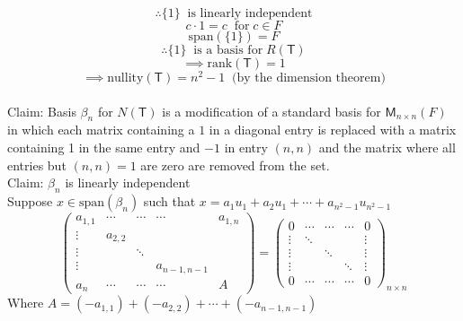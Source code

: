 \begin{enumerate}[(a)]
\begin{equation}
\therefore \{1\}\;\; \text{is linearly independent}
\end{equation}
\begin{equation}
c\cdot 1= c\;\;\text{for}\; c \in F
\end{equation}
\begin{equation}
\text{span}(\{1\}) = F
\end{equation}
\begin{equation}
\therefore \{1\}\;\;\text{is a basis for}\; R(\mathsf{T})
\end{equation}
\begin{equation}
\implies \text{rank}(\mathsf{T}) =1
\end{equation}
\begin{equation}
\implies \text{nullity}(\mathsf{T})=n^2 -1\;\;\text{(by the dimension theorem)}
\end{equation}
\\Claim: Basis $\beta_n$ for $N(\mathsf{T})$ is a modification of a standard
basis for $\mathsf{M}_{n\times n}(F)$ in which each matrix containing
a $1$ in a diagonal entry is replaced with a matrix containing 1 in the
same entry and $-1$ in entry $(n,n)$ and the matrix where all entries
but $(n,n)=1$ are zero are removed from the set.
\\Claim: $\beta_n$ is linearly independent 
\\Suppose $x \in \text{span}(\beta_n)$ such that
$x=a_1u_1+a_2u_1+\cdots+a_{n^2-1}u_{n^2-1}$
\begin{equation}
\begin{pmatrix}
a_{1,1} &\cdots & \cdots& \cdots& a_{1,n}\\
\vdots & a_{2,2}\\
\vdots &       & \ddots &\\
\vdots &       &        & a_{n-1,n-1}\\
a_n    & \cdots     &    \cdots   &   \cdots       & A
\end{pmatrix}
= \begin{pmatrix}
0 & \cdots & \cdots& \cdots& 0\\
\vdots & \ddots & & & \vdots\\
\vdots & & \ddots & & \vdots\\
\vdots & & & \ddots& \vdots\\
0 & \cdots & \cdots& \cdots& 0
\end{pmatrix}_{n\times n}
\end{equation}
Where $A= (-a_{1,1})+(-a_{2,2})+\cdots+(-a_{n-1,n-1})$

\end{enumerate}
